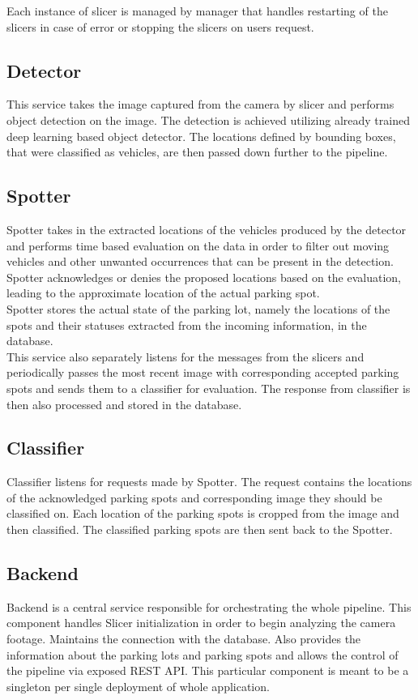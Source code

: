 \documentclass[thesis=M,english]{FITthesis}[2019/03/06]
\begin{document}
Each instance of slicer is managed by manager that handles restarting of the slicers in case of error or stopping the slicers on users request.
\subsection{Detector}
This service takes the image captured from the camera by slicer and performs object detection on the image. The detection is achieved utilizing already trained deep learning based object detector. The locations defined by bounding boxes, that were classified as vehicles, are then passed down further to the pipeline.

\subsection{Spotter}
Spotter takes in the extracted locations of the vehicles produced by the detector and performs time based evaluation on the data in order to filter out moving vehicles and other unwanted occurrences that can be present in the detection. Spotter acknowledges or denies the proposed locations based on the evaluation, leading to the approximate location of the actual parking spot.\\

Spotter stores the actual state of the parking lot, namely the locations of the spots and their statuses extracted from the incoming information, in the database. \\

This service also separately listens for the messages from the slicers and periodically passes the most recent image with corresponding accepted parking spots and sends them to a classifier for evaluation. The response from classifier is then also processed and stored in the database.
\subsection{Classifier}
Classifier listens for requests made by Spotter. The request contains the locations of the acknowledged parking spots and corresponding image they should be classified on. Each location of the parking spots is cropped from the image and then classified. The classified parking spots are then sent back to the Spotter.

\subsection{Backend}
Backend is a central service responsible for orchestrating the whole pipeline. This component handles Slicer initialization in order to begin analyzing the camera footage. Maintains the connection with the database. Also provides the information about the parking lots and parking spots and allows the control of the pipeline via exposed REST API. This particular component is meant to be a singleton per single deployment of whole application.
\end{document}
